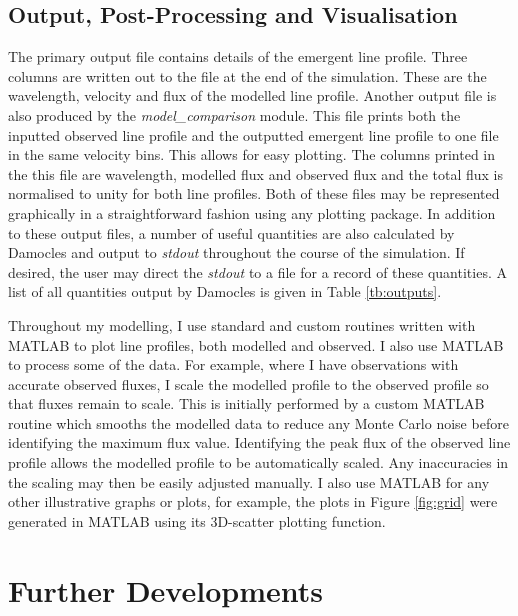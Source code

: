 \subsection{Output, Post-Processing and Visualisation}

The primary output file contains details of the emergent line profile.  Three columns are written out to the file at the end of the simulation.  These are the wavelength, velocity and flux of the modelled line profile.  Another output file is also produced by the \textit{model\_comparison} module.  This file prints both the inputted observed line profile and the outputted emergent line profile to one file in the same velocity bins.  This allows for easy plotting.  The columns printed in the this file are wavelength, modelled flux and observed flux and the total flux is normalised to unity for both line profiles.  Both of these files may be represented graphically in a straightforward fashion using any plotting package.  In addition to these output files, a number of useful quantities are also calculated by Damocles and output to \textit{stdout} throughout the course of the simulation.  If desired, the user may direct the \textit{stdout} to a file for a record of these quantities.  A list of all quantities output by Damocles is given in Table \ref{tb:outputs}.

Throughout my modelling, I use standard and custom routines written with MATLAB to plot line profiles, both modelled and observed.  I also use MATLAB to process some of the data.  For example, where I have observations with accurate observed fluxes, I scale the modelled profile to the observed profile so that fluxes remain to scale.  This is initially performed by a custom MATLAB routine which smooths the modelled data to reduce any Monte Carlo noise before identifying the maximum flux value.  Identifying the peak flux of the observed line profile allows the modelled profile to be automatically scaled.  Any inaccuracies in the scaling may then be easily adjusted manually.  I also use MATLAB for any other illustrative graphs or plots, for example, the plots in Figure \ref{fig:grid} were generated in MATLAB using its 3D-scatter plotting function.

\section{Further Developments}

